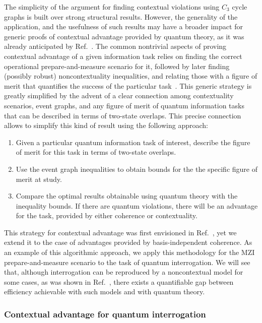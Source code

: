 \documentclass[letterpaper,onecolumn,12pt,accepted=2024-01-17]{article}
\begin{document}
The simplicity of the argument for finding contextual violations using $C_3$ cycle graphs is built over strong structural results. However, the generality of the application, and the usefulness of such results may have a broader impact for generic proofs of contextual advantage provided by quantum theory, as it was already anticipated by Ref.~\cite{Lostaglio2020contextualadvantage}. The common nontrivial aspects of  proving contextual advantage of a given information task relies on finding the correct operational prepare-and-measure scenario for it, followed by later finding (possibly robust) noncontextuality inequalities, and relating those with a figure of merit that quantifies the success of the particular task~\cite{Lostaglio2020contextualadvantage,schmid2018discrimination,flatt2021contextual,carceller2022quantum,mukherjee2021discriminating}. This generic strategy is greatly simplified by the advent of a clear connection among contextuality scenarios, event graphs, and any figure of merit of quantum information tasks that can be described in terms of two-state overlaps. This precise connection allows to simplify this kind of result using the following approach:
\begin{enumerate}
    \item Given a particular quantum information task of interest, describe the figure of merit for this task in terms of two-state overlaps.
    \item Use the event graph inequalities to obtain bounds for the {  the specific figure of merit at study}. 
    \item Compare the optimal results obtainable using quantum theory with the inequality bounds. If there are quantum violations, there will be an advantage for the task, provided by either coherence or contextuality. 
\end{enumerate}
This strategy for contextual advantage was first envisioned in Ref.~\cite{Lostaglio2020contextualadvantage}, yet we extend it to the case of advantages provided by basis-independent coherence. As an example of this algorithmic approach, we apply this methodology for the MZI prepare-and-measure scenario to the task of quantum interrogation. We will see that, although   interrogation can be reproduced by a noncontextual model for some cases, as was shown in Ref.~\cite{catani2021interference}, there exists a quantifiable gap between efficiency achievable with such models and with quantum theory.

\subsubsection{Contextual advantage for quantum interrogation}\label{subsubsec: contextual advantage}
\end{document}
